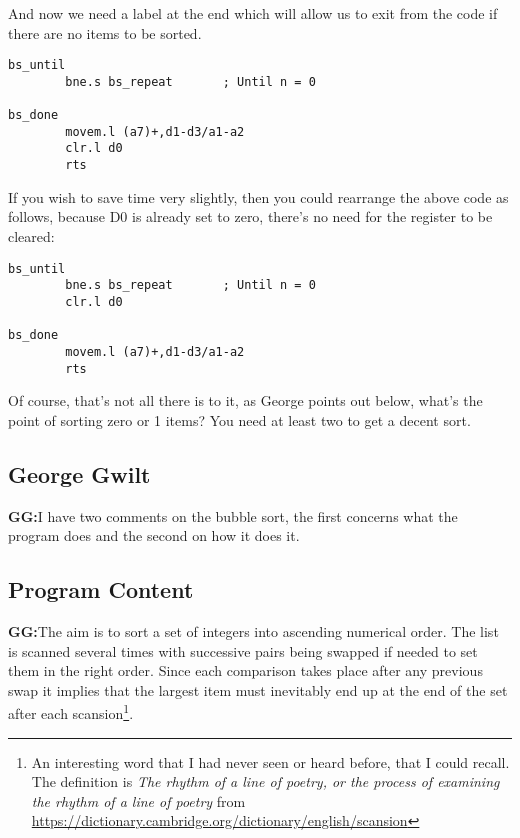 And now we need a label  at the end which will allow us to exit from the code if there are no items to be sorted.

\begin{lstlisting}[firstnumber=96,caption={Better Bubblesort - Bug Fix 1b}]
bs_until
        bne.s bs_repeat       ; Until n = 0

bs_done
        movem.l (a7)+,d1-d3/a1-a2
        clr.l d0
        rts
\end{lstlisting}

If you wish to save time very slightly, then you could rearrange the above code as follows, because D0 is already set to zero, there's no need for the register to be cleared:

\begin{lstlisting}[firstnumber=96,caption={Better Bubblesort - Better Bug Fix 1b}]
bs_until
        bne.s bs_repeat       ; Until n = 0
        clr.l d0

bs_done
        movem.l (a7)+,d1-d3/a1-a2
        rts
\end{lstlisting}

Of course, that's not all there is to it, as George points out below, what's the point of sorting zero or 1 items? You need at least two to get a decent sort.

\subsection {George Gwilt}

\textbf{GG:}I have two comments on the bubble sort, the first concerns what the program
does and the second on how it does it.


\subsection{Program Content}

\textbf{GG:}The aim is to sort a set of integers into ascending numerical order. The list is scanned several times with successive pairs being swapped if needed to set them in the right order. Since each comparison takes place after any previous swap it implies that the largest item must inevitably end up at the end of the set after each scansion\footnote{An interesting word that I had never seen or heard before, that I could recall. The definition is \emph{The rhythm of a line of poetry, or the process of examining the rhythm of a line of poetry} from \url{https://dictionary.cambridge.org/dictionary/english/scansion}}. 

